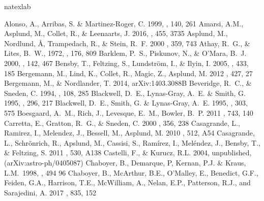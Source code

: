\documentclass[revtex4]{emulateapj}
\begin{document}
\begin{thebibliography}{1}
\expandafter\ifx\csname natexlab\endcsname\relax\def\natexlab#1{#1}\fi

 Alonso, A., Arribas, S. \& Martinez-Roger, C. 1999, \aap, 140, 261
 Amarsi, A.M., Asplund, M., Collet, R., \&
Leenaarts, J. 2016, \mnras, 455, 3735
 Asplund, M., Nordlund, \AA , Trampedach, R.,
 \& Stein, R.~F. 2000 \aap, 359, 743
  Athay, R.~G., \& Lites, B.~W., 1972, \apj, 176, 809
 Barklem, P.~S., Piskunov, N., \& O'Mara, B.~J. 2000, \aap, 142, 467
 Bensby, T., Feltzing, S., Lundstr\"om, I., \& Ilyin, I. 2005, \aap, 433, 185
 Bergemann, M., Lind, K., Collet, R., Magic, Z., Asplund, M. 2012 \mnras, 427, 27
 Bergemann, M., \& Nordlander, T. 2014, arXiv:1403.3088B
 Beveridge, R.~C., \& Sneden, C. 1994, \aj, 108, 285
 Blackwell, D.~E., Lynas-Gray, A.~E. \& Smith, G. 1995, \aap, 296, 217
 Blackwell, D.~E., Smith, G. \& Lynas-Gray, A.~E. 1995, \aap, 303, 575
 Boesgaard, A.~M., Rich, J., Levesque, E.~M., Bowler, B.~P. 2011 \apj, 743, 140 
 Carretta, E., Gratton, R.~G., \& Sneden, C. 2000 \aap, 356, 238
 Casagrande, L., Ramirez, I., Melendez, J., Bessell, M., Asplund, M. 2010 \aap, 512, A54
 Casagrande, L., Schr\"onrich, R., Apslund, M., Cassisi, S., Ram\'irez, I., Mel\'endez, J., Bensby, T., \& Feltzing, S. 2011 \aap, 530, A138
 Castelli, F., \& Kurucz, R.L. 2004, unpublished, (arXiv:astro-ph/0405087)
Chaboyer, B., Demarque, P, Kernan, P.J. \& Kraus, L.M.\ 1998, \apj, 494 96
 Chaboyer, B., McArthur, B.E., O'Malley, E., Benedict, G.F., Feiden, G.A., Harrison, T.E., McWilliam, A., Nelan, E.P., Patterson, R.J., and Sarajedini, A. 2017 \apj, 835, 152

\end{thebibliography}
\end{document}
